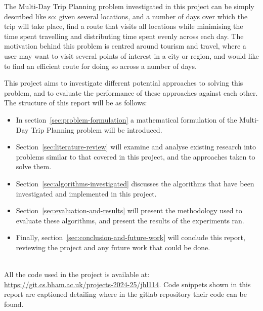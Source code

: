 The Multi-Day Trip Planning problem investigated in this project can be simply described like so: given several
locations, and a number of days over which the trip will take place, find a route that visits all locations while
minimising the time spent travelling and distributing time spent evenly across each day.
The motivation behind this problem is centred around tourism and travel, where a user may want to visit several
points of interest in a city or region, and would like to find an efficient route for doing so across a number of days.

This project aims to investigate different potential approaches to solving this problem, and to evaluate the performance
of these approaches against each other.
The structure of this report will be as follows:
\begin{itemize}
    \item In section~\ref{sec:problem-formulation} a mathematical formulation of the Multi-Day Trip Planning problem
    will be introduced.
    \item Section~\ref{sec:literature-review} will examine and analyse existing research into problems similar to
    that covered in this project, and the approaches taken to solve them.
    \item Section~\ref{sec:algorithms-investigated} discusses the algorithms that have been investigated and
    implemented in this project.
    \item Section~\ref{sec:evaluation-and-results} will present the methodology used to evaluate these
    algorithms, and present the results of the experiments ran.
    \item Finally, section~\ref{sec:conclusion-and-future-work} will conclude this report, reviewing the project and
    any future work that could be done.
\end{itemize}\\

\noindent
All the code used in the project is available at: \url{https://git.cs.bham.ac.uk/projects-2024-25/jhl114}.
Code snippets shown in this report are captioned detailing where in the gitlab repository their code can be found.